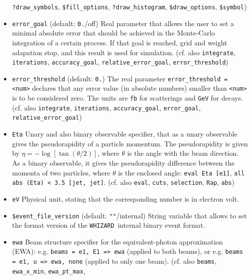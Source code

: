 \documentclass[12pt]{book}
\newcommand{\ttt}[1]{\texttt{#1}}
\newcommand{\whizard}{\texttt{WHIZARD}}
\begin{document}
\begin{itemize}
\newline \ttt{?draw\_symbols}, \ttt{\$fill\_options}, \ttt{?draw\_histogram},
\ttt{\$draw\_options}, \ttt{\$symbol})
\item
\ttt{error\_goal} \qquad (default: \ttt{0.}/off) \newline
Real parameter that allows the user to set a minimal absolute error
that should be achieved in the Monte-Carlo integration of a certain 
process. If that goal is reached, grid and weight adapation stop, and
this result is used for simulation. (cf. also \ttt{integrate},
\ttt{iterations}, \ttt{accuracy\_goal}, \ttt{relative\_error\_goal},
\ttt{error\_threshold}) 
\item
\ttt{error\_threshold} \qquad (default: \ttt{0.}) \newline
The real parameter \ttt{error\_threshold = <num>} declares that any
error value (in absolute numbers) smaller than \ttt{<num>} is to be
considered zero. The units are \ttt{fb} for scatterings and \ttt{GeV}
for decays. (cf. also \ttt{integrate}, \ttt{iterations},
\ttt{accuracy\_goal}, \ttt{error\_goal}, \ttt{relative\_error\_goal}) 
\item
\ttt{Eta} \newline
Unary and also binary observable specifier, that as a unary observable
gives the pseudorapidity of a particle momentum. The pseudorapidity is
given by $\eta = - \log \left[ \tan (\theta/2) \right]$, where
$\theta$ is the angle with the beam direction. As a binary
observable, it gives the pseudorapidity difference between the momenta
of two particles, where $\theta$ is the enclosed angle: \ttt{eval Eta
[e1]},  \ttt{all abs (Eta) < 3.5 [jet, jet]}. (cf. also \ttt{eval},
\ttt{cuts}, \ttt{selection}, \ttt{Rap}, \ttt{abs})  
\item
\ttt{eV} \newline
Physical unit, stating that the corresponding number is in electron volt.
\item
\ttt{\$event\_file\_version} \qquad (default: \ttt{""}/internal)
\newline 
String variable that allows to set the format version of the \whizard\
internal binary event format. 
\item
\ttt{ewa} \newline
Beam structure specifier for the equivalent-photon approximation
(EWA): e.g. \ttt{beams = e1, E1 => ewa} (applied to both beams), or
e.g. \ttt{beams = e1, u => ewa, none} (applied to only one
beam). (cf. also \ttt{beams}, \ttt{ewa\_x\_min}, \ttt{ewa\_pt\_max},

\end{itemize}
\end{document}

